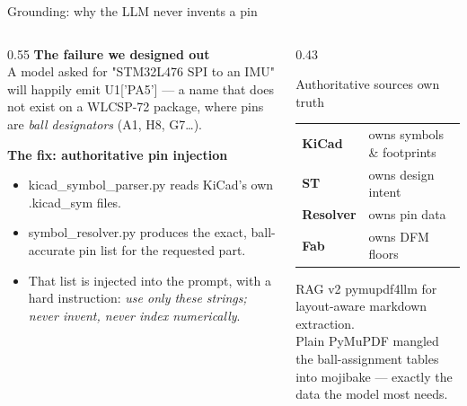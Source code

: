 \documentclass[aspectratio=169,10pt]{beamer}
\newcommand{\code}[1]{{\ttfamily\small #1}}
\begin{document}
\begin{frame}{Grounding: why the LLM never invents a pin}
\vspace{1mm}
\begin{columns}[T]
\begin{column}{0.55\textwidth}
\textbf{The failure we designed out}\\[2pt]
\small A model asked for "STM32L476 SPI to an IMU" will happily emit \code{U1['PA5']} --- a name that does not exist on a WLCSP-72 package, where pins are \emph{ball designators} (\code{A1}, \code{H8}, \code{G7}\ldots).
\vspace{3mm}

\textbf{The fix: authoritative pin injection}
\begin{itemize}\small
  \item \code{kicad\_symbol\_parser.py} reads KiCad's own \code{.kicad\_sym} files.
  \item \code{symbol\_resolver.py} produces the exact, ball-accurate pin list for the requested part.
  \item That list is injected into the prompt, with a hard instruction: \emph{use only these strings; never invent, never index numerically}.
\end{itemize}
\end{column}
\begin{column}{0.43\textwidth}
\begin{block}{Authoritative sources own truth}
\small
\begin{tabular}{@{}ll@{}}
\textbf{KiCad} & owns symbols \& footprints\\
\textbf{ST} & owns design intent\\
\textbf{Resolver} & owns pin data\\
\textbf{Fab} & owns DFM floors\\
\end{tabular}
\end{block}
\vspace{1mm}
\begin{block}{RAG v2}
\small
\code{pymupdf4llm} for layout-aware markdown extraction.\\[3pt]
{\footnotesize Plain PyMuPDF mangled the ball-assignment tables into mojibake --- exactly the data the model most needs.}
\end{block}
\end{column}
\end{columns}
\end{frame}
\end{document}
